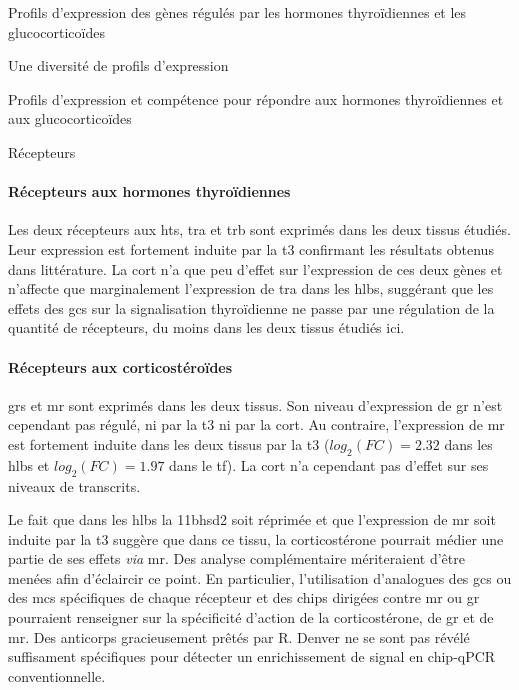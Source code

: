 \documentclass[../main.tex]{subfiles}
\begin{document}
\begin{chapter}{Profils d'expression des gènes régulés par les hormones thyroïdiennes et les glucocorticoïdes}
\begin{section}{Une diversité de profils d'expression}
\begin{subsection}{Profils d'expression et compétence pour répondre aux hormones thyroïdiennes et aux glucocorticoïdes}
\begin{subsubsection}{Récepteurs}
\paragraph{Récepteurs aux hormones thyroïdiennes}
Les deux récepteurs aux \glspl{ht}, \gls{tra} et \gls{trb} sont exprimés dans les deux tissus étudiés.
Leur expression est fortement induite par la \gls{t3} confirmant les résultats obtenus dans littérature.
La \gls{cort} n'a que peu d'effet sur l'expression de ces deux gènes et n'affecte que marginalement l'expression de \gls{tra} dans les \glspl{hlb}, suggérant que les effets des \glspl{gc} sur la signalisation thyroïdienne ne passe par une régulation de la quantité de récepteurs, du moins dans les deux tissus étudiés ici.

\paragraph{Récepteurs aux corticostéroïdes}
\glspl{gr} et \gls{mr} sont exprimés dans les deux tissus.
Son niveau d'expression de \gls{gr} n'est cependant pas régulé, ni par la \gls{t3} ni par la \gls{cort}.
Au contraire, l'expression de \gls{mr} est fortement induite dans les deux tissus par la \gls{t3} ($log_2(FC)=2.32$ dans les \glspl{hlb} et $log_2(FC)=1.97$ dans le \gls{tf}).
La \gls{cort} n'a cependant pas d'effet sur ses niveaux de transcrits.
\par
Le fait que dans les \glspl{hlb} la \gls{11bhsd2} soit réprimée et que l'expression de \gls{mr} soit induite par la \gls{t3} suggère que dans ce tissu, la corticostérone pourrait médier une partie de ses effets \textit{via} \gls{mr}.
Des analyse complémentaire mériteraient d'être menées afin d'éclaircir ce point.
En particulier, l'utilisation d'analogues des \glspl{gc} ou des \glspl{mc} spécifiques de chaque récepteur et des \glspl{chip} dirigées contre \gls{mr} ou \gls{gr} pourraient renseigner sur la spécificité d'action de la corticostérone, de \gls{gr} et de \gls{mr}.
Des anticorps gracieusement prêtés par R. Denver ne se sont pas révélé suffisament spécifiques pour détecter un enrichissement de signal en \gls{chip}-qPCR conventionnelle.
\end{subsubsection}


\end{subsection}
\end{section}
\end{chapter}
\end{document}
